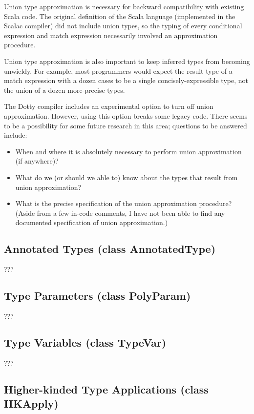\documentclass[11pt]{report}
\newcommand{\cdf}{\bf\ttfamily} %
\newcommand{\cd}{\cdf\small}  %
\begin{document}
Union type approximation is necessary for backward compatibility with existing Scala code. The original definition of the Scala language (implemented in the Scalac compiler) did not include union types, so the typing of every conditional expression and match expression necessarily involved an approximation procedure.

Union type approximation is also important to keep inferred types from becoming unwieldy. For example, most programmers would expect the result type of a match expression with a dozen cases to be a single concisely-expressible type, not the union of a dozen more-precise types.

The Dotty compiler includes an experimental option to turn off union approximation. However, using this option breaks some legacy code. There seems to be a possibility for some future research in this area; questions to be answered include:
\begin{itemize}
\item When and where it is absolutely necessary to perform union approximation (if anywhere)?
\item What do we (or should we able to) know about the types that result from union approximation?
\item What is the precise specification of the union approximation procedure? (Aside from a few in-code comments, I have not been able to find any documented specification of union approximation.)
\end{itemize}

\subsection{Annotated Types (class AnnotatedType)}

???

\subsection{Type Parameters (class PolyParam)}

???

\subsection{Type Variables (class TypeVar)}

???

\subsection{Higher-kinded Type Applications (class HKApply)}
\end{document}
